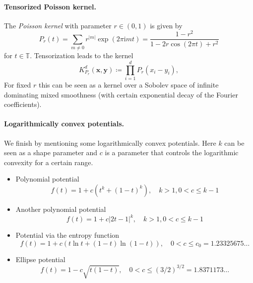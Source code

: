 \documentclass[a4paper,12pt]{article}
\numberwithin{equation}{section}
\theoremstyle{definition}
\newcommand{\bx}{\mathbf{x}}
\newcommand{\by}{\mathbf{y}}
\newcommand{\bbT}{\mathbb{T}}
\newcommand{\iu}{\mathrm{i}}
\begin{document}
\paragraph{Tensorized Poisson kernel.} The \emph{Poisson kernel} with parameter $r \in (0, 1)$ is given by
$$
P_r(t)= \sum_{m \neq 0} r^{|m|} \exp(2\pi\iu m t) = \frac{1-r^2}{1 - 2 r \cos(2\pi t) + r^2}
$$
for $t \in \bbT$. Tensorization leads to the kernel
$$
K^d_{P_r}(\bx, \by) \coloneqq \prod_{i=1}^d P_r(x_i-y_i),
$$
For fixed $r$ this can be seen as a kernel over a Sobolev space of infinite dominating mixed smoothness (with certain exponential decay of the Fourier coefficients).

\paragraph{Logarithmically convex potentials.} We finish by mentioning some logarithmically convex potentials. Here $k$ can be seen as a shape parameter and $c$ is a parameter that controls the logarithmic convexity for a certain range.
\begin{itemize}
	\item Polynomial potential
	$$
	f(t) = 1 + c\left(t^k + (1-t)^k\right), \quad k > 1, 0<c \leq k-1
	$$
	
	\item Another polynomial potential
	$$
	f(t) = 1 + c \left|2t-1\right|^k, \quad k > 1, 0<c \leq k-1
	$$
	
	\item Potential via the entropy function
	$$
	f(t) = 1 + c\left(t \ln t + (1-t) \ln (1-t)\right), \quad 0 < c \leq c_0 = 1.23325675\dots
	$$
	
	\item Ellipse potential
	$$
	f(t) = 1 - c \sqrt{t(1-t)}, \quad 0 < c \leq (3/2)^{3/2} = 1.8371173\dots
	$$
\end{itemize}




\end{document}
